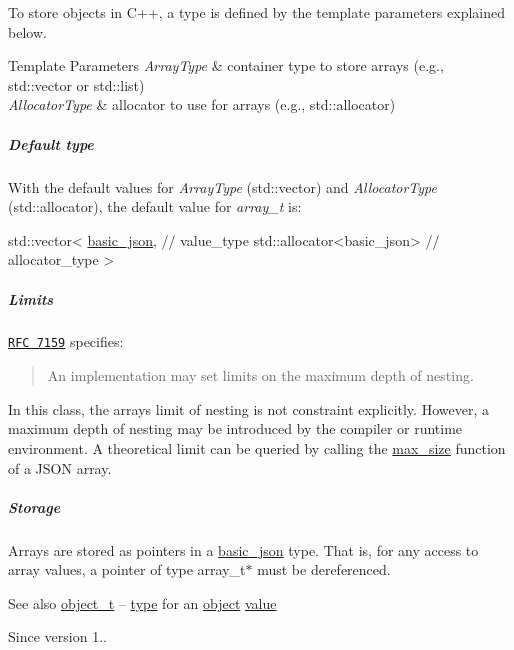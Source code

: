 To store objects in C++, a type is defined by the template parameters explained below.


\begin{DoxyTemplParams}{Template Parameters}
{\em Array\+Type} & container type to store arrays (e.\+g., {\ttfamily std\+::vector} or {\ttfamily std\+::list}) \\
\hline
{\em Allocator\+Type} & allocator to use for arrays (e.\+g., {\ttfamily std\+::allocator})\\
\hline
\end{DoxyTemplParams}
\subparagraph*{Default type}

With the default values for {\itshape Array\+Type} ({\ttfamily std\+::vector}) and {\itshape Allocator\+Type} ({\ttfamily std\+::allocator}), the default value for {\itshape array\+\_\+t} is\+:


\begin{DoxyCode}
std::vector<
  \hyperlink{classnlohmann_1_1basic__json_a8f77085bd98c97a983d9ba12efbf6148}{basic\_json}, \textcolor{comment}{// value\_type}
  std::allocator<basic\_json> \textcolor{comment}{// allocator\_type}
>
\end{DoxyCode}


\subparagraph*{Limits}

\href{http://rfc7159.net/rfc7159}{\tt R\+FC 7159} specifies\+: \begin{quote}
An implementation may set limits on the maximum depth of nesting. \end{quote}


In this class, the array\textquotesingle{}s limit of nesting is not constraint explicitly. However, a maximum depth of nesting may be introduced by the compiler or runtime environment. A theoretical limit can be queried by calling the \hyperlink{classnlohmann_1_1basic__json_a7936417b875b7ec737f77ef84bbf7871}{max\+\_\+size} function of a J\+S\+ON array.

\subparagraph*{Storage}

Arrays are stored as pointers in a \hyperlink{classnlohmann_1_1basic__json}{basic\+\_\+json} type. That is, for any access to array values, a pointer of type {\ttfamily array\+\_\+t$\ast$} must be dereferenced.

\begin{DoxySeeAlso}{See also}
\hyperlink{classnlohmann_1_1basic__json_a0ac9894c9de8dc551cf2e5f1c605537f}{object\+\_\+t} -- \hyperlink{classnlohmann_1_1basic__json_a5d466b240d0ba9f648d7fd4ff42359f5}{type} for an \hyperlink{classnlohmann_1_1basic__json_ad25b2f8c21e241e2d63455537a9294ff}{object} \hyperlink{classnlohmann_1_1basic__json_a407e73a037e6e3067ef7aa2c25a79f39}{value}
\end{DoxySeeAlso}
\begin{DoxySince}{Since}
version 1.. 
\end{DoxySince}
\hypertarget{classnlohmann_1_1basic__json_af3bc3e83aa162d7ba4df16a949872723}{}\label{classnlohmann_1_1basic__json_af3bc3e83aa162d7ba4df16a949872723} 
